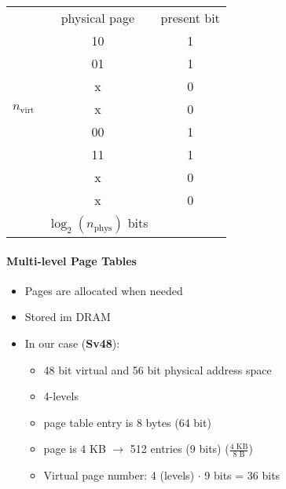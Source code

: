\renewcommand{\arraystretch}{1.3}
\setlength{\oldtabcolsep}{\tabcolsep}\setlength\tabcolsep{6pt}
\begin{tabularx}{\linewidth}{@{} c c c@{}}
                                                                                   & physical page                  & present bit \\
    \cmidrule{2-3}
    \multirow{7}{*}{\begin{sideways}$n_{\text{virt}}$\end{sideways}} & 10                             & 1           \\
                                                                                   & 01                             & 1           \\
                                                                                   & x                              & 0           \\
                                                                                   & x                              & 0           \\
                                                                                   & 00                             & 1           \\
                                                                                   & 11                             & 1           \\
                                                                                   & x                              & 0           \\
                                                                                   & x                              & 0           \\
    \cmidrule{2-3}
                                                                                   & $\log_2(n_{\text{phys}})$ bits &
\end{tabularx}

\paragraph{Multi-level Page Tables}
\begin{itemize}
    \item Pages are allocated when needed
    \item Stored im DRAM
    \item In our case (\textbf{Sv48}):
          \begin{itemize}
              \item 48 bit virtual and 56 bit physical address space
              \item 4-levels
              \item page table entry is 8 bytes (64 bit)
              \item page is 4 KB $\to$ 512 entries (9 bits) ($\frac{\text{4 KB}}{\text{8 B}}$)
              \item Virtual page number: 4 (levels) $\cdot$ 9 bits = 36 bits
          \end{itemize}
\end{itemize}

